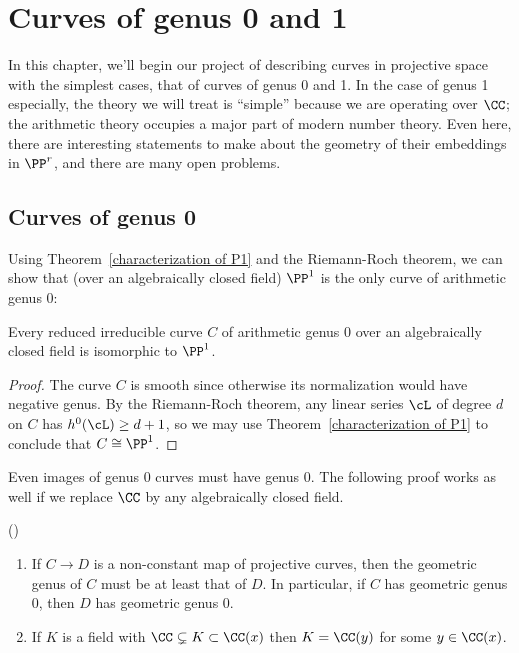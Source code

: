 

\chapter{Curves of genus 0 and 1}\label{genus 0 and 1 chapter}

In this chapter, we'll begin our project of describing curves in projective space with the simplest cases, that of curves of genus 0 and 1. In the case of genus 1 especially, the theory we will treat is ``simple'' because we are operating over $\CC$; the arithmetic theory occupies a major part of modern number theory. Even here, there are interesting statements to make about the geometry of their embeddings in $\PP^r$, and there are many open problems.


\section{Curves of genus 0} 

Using Theorem~\ref{characterization of P1} and the Riemann-Roch theorem, we can show that (over an algebraically closed field) $\PP^1$
is the only curve of arithmetic genus 0:

\begin{corollary}
 Every reduced irreducible curve $C$ of arithmetic genus 0 over an algebraically closed field is isomorphic to $\PP^1$.
 \end{corollary}

\begin{proof}
The curve $C$ is smooth since otherwise its normalization would have negative genus.
By the Riemann-Roch theorem, any linear series $\cL$ of degree $d$ on $C$ has $h^0(\cL) \geq d+1$, so we may use Theorem~\ref{characterization of P1}
to conclude that $C\cong \PP^1$.
\end{proof}

Even images of genus 0 curves must have genus 0. The following proof works as well if we replace $\CC$ by any algebraically
closed field.

\begin{theorem}(\cite{Luroth})\label{Lueroth}
\begin{enumerate}
\item If $C\to D$ is a non-constant map of projective curves, then the geometric genus of $C$ must be at least that of $D$.
In particular, if $C$ has geometric genus 0,  
then $D$ has geometric genus 0.
 \item If $K$ is a field with $\CC \subsetneq K \subset \CC(x)$
  then $K = \CC(y)$ for some $y \in \CC(x)$. 
\end{enumerate}
\end{theorem}


